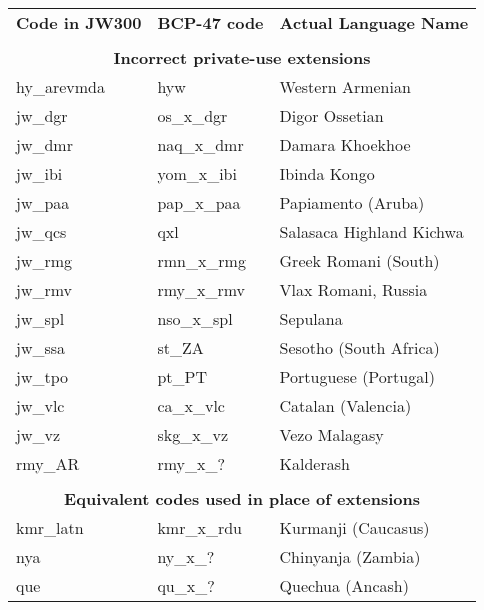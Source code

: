 \begin{table}[th!]
    \centering\small
        \begin{tabular}{lll}


            \toprule
            \textbf{Code in JW300} & \textbf{BCP-47 code} & \textbf{Actual Language Name} \\
            \multicolumn{3}{c}{}                                                          \\
            \multicolumn{3}{c}{\textbf{Incorrect private-use extensions}}                 \\
            \midrule
            hy\_arevmda            & hyw                  & Western Armenian              \\
            jw\_dgr                & os\_x\_dgr           & Digor Ossetian                \\
            jw\_dmr                & naq\_x\_dmr          & Damara Khoekhoe               \\
            jw\_ibi                & yom\_x\_ibi          & Ibinda Kongo                  \\
            jw\_paa                & pap\_x\_paa          & Papiamento (Aruba)            \\
            jw\_qcs                & qxl                  & Salasaca Highland Kichwa      \\
            jw\_rmg                & rmn\_x\_rmg          & Greek Romani (South)          \\
            jw\_rmv                & rmy\_x\_rmv          & Vlax Romani, Russia           \\
            jw\_spl                & nso\_x\_spl          & Sepulana                      \\
            jw\_ssa                & st\_ZA               & Sesotho (South Africa)        \\
            jw\_tpo                & pt\_PT               & Portuguese (Portugal)         \\
            jw\_vlc                & ca\_x\_vlc           & Catalan (Valencia)            \\
            jw\_vz                 & skg\_x\_vz           & Vezo Malagasy                 \\
            rmy\_AR                & rmy\_x\_?            & Kalderash                     \\

            \multicolumn{3}{c}{}                                                          \\
            \multicolumn{3}{c}{\textbf{Equivalent codes used in place of extensions}}     \\
            \midrule
            kmr\_latn              & kmr\_x\_rdu          & Kurmanji (Caucasus)           \\
            nya                    & ny\_x\_?             & Chinyanja (Zambia)            \\
            que                    & qu\_x\_?             & Quechua (Ancash)              \\


\end{tabular}
\end{table}
